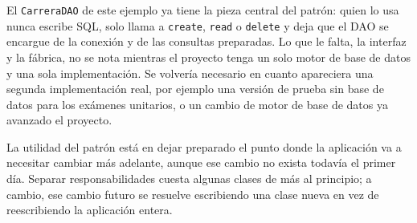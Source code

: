 \documentclass[10pt,a4paper]{article}
\begin{document}
El \texttt{CarreraDAO} de este ejemplo ya tiene la pieza central del patrón: quien lo usa nunca escribe SQL, solo llama a \texttt{create}, \texttt{read} o \texttt{delete} y deja que el DAO se encargue de la conexión y de las consultas preparadas. Lo que le falta, la interfaz y la fábrica, no se nota mientras el proyecto tenga un solo motor de base de datos y una sola implementación. Se volvería necesario en cuanto apareciera una segunda implementación real, por ejemplo una versión de prueba sin base de datos para los exámenes unitarios, o un cambio de motor de base de datos ya avanzado el proyecto.

La utilidad del patrón está en dejar preparado el punto donde la aplicación va a necesitar cambiar más adelante, aunque ese cambio no exista todavía el primer día. Separar responsabilidades cuesta algunas clases de más al principio; a cambio, ese cambio futuro se resuelve escribiendo una clase nueva en vez de reescribiendo la aplicación entera.


\pagebreak

\section{\color{colorIPN}{Referencias Bibliográficas}}
\nocite{*}
\color{colorESCOM}{
	\printbibliography[heading=none]
}
\end{document}
